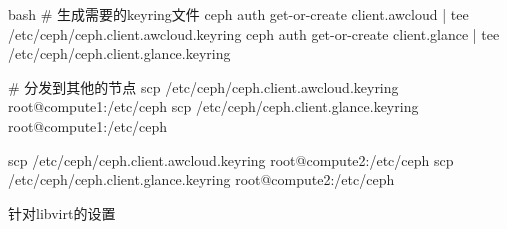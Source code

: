 \begin{outline}[enumerate]
\begin{code-in-enumerate}{bash}
# 生成需要的keyring文件
ceph auth get-or-create client.awcloud | tee /etc/ceph/ceph.client.awcloud.keyring
ceph auth get-or-create client.glance | tee /etc/ceph/ceph.client.glance.keyring

# 分发到其他的节点
scp /etc/ceph/ceph.client.awcloud.keyring root@compute1:/etc/ceph
scp /etc/ceph/ceph.client.glance.keyring root@compute1:/etc/ceph

scp /etc/ceph/ceph.client.awcloud.keyring root@compute2:/etc/ceph
scp /etc/ceph/ceph.client.glance.keyring root@compute2:/etc/ceph
\end{code-in-enumerate}

  \1 针对libvirt的设置

\end{outline}
